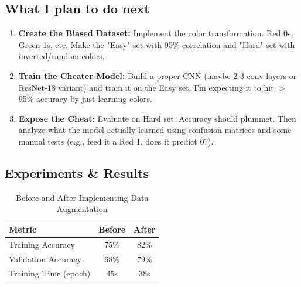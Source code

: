 \documentclass[9pt,a4paper,twocolumn,twoside]{tau-class/tau}
\begin{document}
    \subsection{What I plan to do next}
    
        \begin{enumerate}
            \item \textbf{Create the Biased Dataset:} Implement the color transformation. Red 0s, Green 1s, etc. Make the "Easy" set with 95\% correlation and "Hard" set with inverted/random colors.
            
            \item \textbf{Train the Cheater Model:} Build a proper CNN (maybe 2-3 conv layers or ResNet-18 variant) and train it on the Easy set. I'm expecting it to hit $>$95\% accuracy by just learning colors.
            
            \item \textbf{Expose the Cheat:} Evaluate on Hard set. Accuracy should plummet. Then analyze what the model actually learned using confusion matrices and some manual tests (e.g., feed it a Red 1, does it predict 0?).
        \end{enumerate}
        
    \subsection{Experiments \& Results}
    
        \begin{table}[H]
            \caption{Before and After Implementing Data Augmentation}
            \label{tab:data_augmentation}
            \begin{tabular}{lcc}
            \toprule
            \textbf{Metric} & \textbf{Before} & \textbf{After} \\
            \midrule
            Training Accuracy & 75\% & 82\% \\
            Validation Accuracy & 68\% & 79\% \\
            Training Time (epoch) & 45s & 38s \\
            \bottomrule
            \end{tabular}
        \end{table}
        
\end{document}
